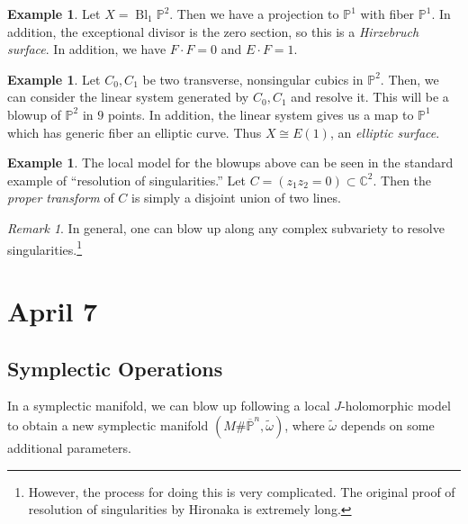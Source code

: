 \documentclass[leqno, openany]{memoir}
\theoremstyle{definition}
\newtheorem{exm}[thm]{Example}
\theoremstyle{remark}
\newtheorem{rmk}[thm]{Remark}
\theoremstyle{plain}
\theoremstyle{definition}
\theoremstyle{remark}
\newcommand{\C}{\mathbb{C}}
\renewcommand{\P}{\mathbb{P}}
\DeclareMathOperator{\Bl}{Bl} %
\begin{document}
    \begin{exm}
        Let $X = \Bl_1 \P^2$. Then we have a projection to $\P^1$ with fiber $\P^1$. In addition, the exceptional divisor is the zero section, so this is a \textit{Hirzebruch surface}. In addition, we have $F \cdot F = 0$ and $E \cdot F = 1$.
    \end{exm}

    \begin{exm}
        Let $C_0, C_1$ be two transverse, nonsingular cubics in $\P^2$. Then, we can consider the linear system generated by $C_0, C_1$ and resolve it. This will be a blowup of $\P^2$ in $9$ points. In addition, the linear system gives us a map to $\P^1$ which has generic fiber an elliptic curve. Thus $X \cong E(1)$, an \textit{elliptic surface}.
    \end{exm}

    \begin{exm}
        The local model for the blowups above can be seen in the standard example of ``resolution of singularities.'' Let $C = (z_1z_2 = 0) \subset \C^2$. Then the \textit{proper transform} of $C$ is simply a disjoint union of two lines.
    \end{exm}

    \begin{rmk}
        In general, one can blow up along any complex subvariety to resolve singularities.\footnote{However, the process for doing this is very complicated. The original proof of resolution of singularities by Hironaka is extremely long.}
    \end{rmk}
    
    \chapter{April 7}%
    \label{cha:april_7}
    
    \section{Symplectic Operations}%
    \label{sec:symplectic_operations}
    
    In a symplectic manifold, we can blow up following a local $J$-holomorphic model to obtain a new symplectic manifold $(M \# \overline{\P}^n, \widetilde{\omega})$, where $\widetilde{\omega}$ depends on some additional parameters.
\end{document}
